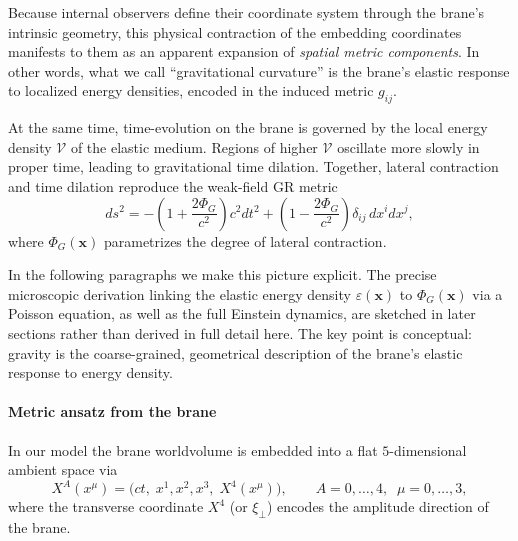 Because internal observers define their coordinate system through the brane's intrinsic geometry, this physical contraction of the embedding coordinates manifests to them as an apparent expansion of \emph{spatial metric components}. In other words, what we call ``gravitational curvature'' is the brane's elastic response to localized energy densities, encoded in the induced metric $g_{ij}$.

At the same time, time-evolution on the brane is governed by the local energy density $\mathcal{V}$ of the elastic medium. Regions of higher $\mathcal{V}$ oscillate more slowly in proper time, leading to gravitational time dilation. Together, lateral contraction and time dilation reproduce the weak-field GR metric
\begin{equation}
ds^2
= -\left(1 + \frac{2\Phi_G}{c^2}\right)c^2 dt^2
+ \left(1 - \frac{2\Phi_G}{c^2}\right)\delta_{ij}\,dx^i dx^j,
\end{equation}
where $\Phi_G(\mathbf x)$ parametrizes the degree of lateral contraction.

In the following paragraphs we make this picture explicit. The precise microscopic derivation linking the elastic energy density $\varepsilon(\mathbf x)$ to $\Phi_G(\mathbf x)$ via a Poisson equation, as well as the full Einstein dynamics, are sketched in later sections rather than derived in full detail here. The key point is conceptual: gravity is the coarse-grained, geometrical description of the brane's elastic response to energy density.

\paragraph{Metric ansatz from the brane}

In our model the brane worldvolume is embedded into a flat $5$-dimensional
ambient space via
\begin{equation}
  X^A(x^\mu) = \bigl( ct,\; x^1,x^2,x^3,\; X^4(x^\mu) \bigr),
  \qquad
  A = 0,\dots,4,\;\; \mu = 0,\dots,3,
\end{equation}
where the transverse coordinate $X^4$ (or $\xi_\perp$) encodes the amplitude direction of the brane.

